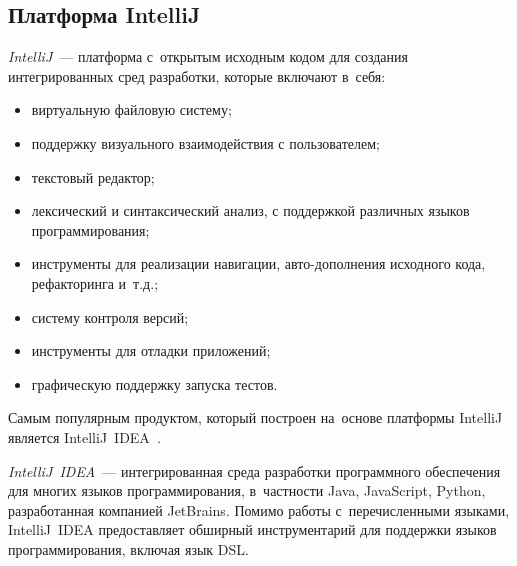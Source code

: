 \subsection{Платформа IntelliJ} \label{sub131}

\textit{IntelliJ}~--- платформа с~открытым исходным кодом для создания интегрированных сред разработки, которые включают в~себя:

\begin{itemize}
\item{виртуальную файловую систему;}
\item{поддержку визуального взаимодействия с пользователем;}	
\item{текстовый редактор;}	
\item{лексический и синтаксический анализ, с поддержкой различных языков программирования;}
\item{инструменты для реализации навигации, авто-дополнения исходного кода, рефакторинга и~т.д.;}
\item{систему контроля версий;}
\item{инструменты для отладки приложений;}
\item{графическую поддержку запуска тестов.}
\end{itemize}

Самым популярным продуктом, который построен на~основе платформы IntelliJ является IntelliJ~IDEA~\cite{web4}.

\textit{IntelliJ~IDEA}~--- интегрированная среда разработки программного обеспечения для многих языков программирования, в~частности Java, JavaScript, Python, разработанная компанией JetBrains. Помимо работы с~перечисленными языками, IntelliJ~IDEA предоставляет обширный инструментарий для поддержки языков программирования, включая язык DSL. 
